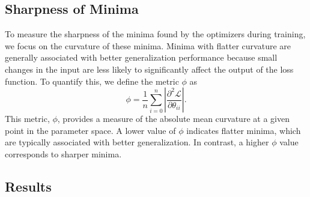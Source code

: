 {\subsection{Sharpness of Minima}
To measure the sharpness of the minima found by the optimizers during training, we focus on the curvature of these minima. 
Minima with flatter curvature are generally associated with better generalization performance because small changes in the input are less likely to significantly affect the output of the loss function.
To quantify this, we define the metric \( \phi \) as 
\[
    \phi =  \frac{1}{n}\sum_{i=0}^{n} \left| \frac{\partial^2 \mathcal{L}}{\partial \theta_{ii}} \right|.
\]
This metric, \( \phi \), provides a measure of the absolute mean curvature at a given point in the parameter space.
A lower value of \( \phi \) indicates flatter minima, which are typically associated with better generalization.
In contrast, a higher \( \phi \) value corresponds to sharper minima.
\subsection{Results}
}




